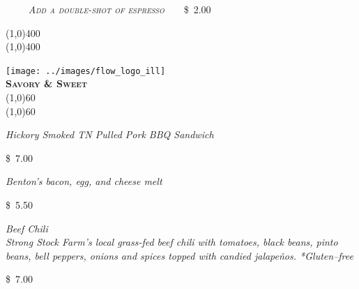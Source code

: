 \documentclass[letterpaper, 12pt]{article}%
\newcommand{\ill}{
\texttt{[image: ../images/flow\_logo\_ill]}
}
\newcommand{\menuentry}[2]{
 \emph{\footnotesize#1}\\
 \vspace*{\fill}
 {\small#2}
}
\newcommand{\menuitem}[4]{
 \centering
  \ill\\
  \smallskip\vspace{0.1em}
  \textbf{\sffamily \textsc{\large#2}}\vspace{-1ex}\\
  \line(1,0){#1}\vspace{-2ex}\\
  \line(1,0){#1}\vspace{0.5ex}\\
  \smallskip
  \menuentry{#3}{#4}
}
\newcommand{\flowtherefore}{~~\raisebox{0.2ex}{$\therefore$}~~}
\newcommand{\price}[2]{
 \textsc{\small#1}\flowtherefore\$~\textsc{\small#2}
}
\newcommand{\varprice}[1]{
 \$~\textsc{\small#1}
}
\newcommand{\heading}[1]{{\large\bfseries #1\par}}
\newcommand{\flowentry}[1]{
{\calligra\centering\heading{\Huge #1}\vspace{-2ex}

\line(1,0){400}\vspace{-3ex}\\
\line(1,0){400}\vspace{-2ex}

}}
\begin{document}

\vspace{1.0em}
{\centering
 \textbf{\textup{\normalsize{}}}\flowtherefore\price{\textrm{\emph{\normalsize Add a double-shot of espresso}}}{2.00}

}

\flowentry{}


\newlength{\ssminihi}
\newlength{\ssminiwi}
\newlength{\ocminiwi}
\setlength{\ssminihi}{0.14\textwidth}
\setlength{\ssminiwi}{0.55\textwidth}
\setlength{\ocminiwi}{0.15\textwidth}

{\centering
\begin{minipage}{0.5\textwidth}
{\centering
\begin{minipage}[t][\ssminihi][b]{\ssminiwi}
 \centering
 \menuitem{60}{
  Savory \& Sweet}{
  \textup{\normalsize Hickory Smoked TN Pulled Pork BBQ Sandwich} %
  }{
  \varprice{7.00}
 }

\vspace{1em}

\menuentry{
  \textup{\normalsize Benton's bacon, egg, and cheese melt}
  }{
  \varprice{5.50}
}

\vspace{1em}

\menuentry{
 \textup{\normalsize Beef Chili}\\
 Strong Stock Farm's local grass-fed beef chili with tomatoes, black beans, pinto beans, bell peppers, onions and spices topped with candied jalape\~{n}os. *Gluten--free
 }{
 \varprice{7.00}
}
\end{minipage}



}
\end{minipage}}
\end{document}
